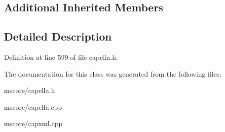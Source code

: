 \subsection*{Additional Inherited Members}


\subsection{Detailed Description}


Definition at line 599 of file capella.\+h.



The documentation for this class was generated from the following files\+:\begin{DoxyCompactItemize}
\item 
mscore/capella.\+h\item 
mscore/capella.\+cpp\item 
mscore/capxml.\+cpp\end{DoxyCompactItemize}
